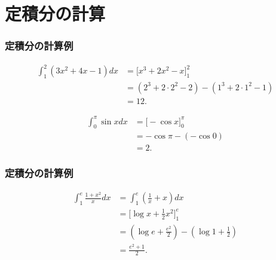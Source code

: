 
\section{定積分の計算}

\begin{frame}
\frametitle{定積分の計算例}

\begin{align*}
\int_1^2(3x^2+4x-1)dx & = \big[x^3+2x^2-x\big]_1^2 \\
& = (2^3+2\cdot 2^2-2)-(1^3+2\cdot 1^2-1) \\
& = 12. 
\end{align*}


\begin{align*}
\int_0^\pi \sin x dx & = \big[ -\cos x\big]_0^\pi \\
& = -\cos \pi - (- \cos 0) \\
& = 2. 
\end{align*}

\end{frame}




\begin{frame}
\frametitle{定積分の計算例}

\begin{align*}
\int_1^e\frac{1+x^2}{x}dx & = \int_1^e(\frac{1}{x}+x)dx \\
& = \big[ \log x + \frac{1}{2}x^2\big]_1^e \\
& = (\log e + \frac{e^2}{2})-(\log 1 +\frac{1}{2})\\
& = \frac{e^2+1}{2}. 
\end{align*}


\end{frame}




